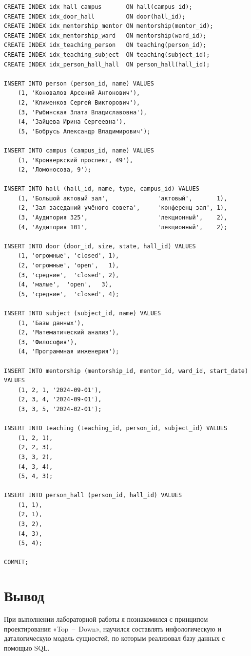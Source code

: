 \documentclass[12pt, a4paper]{article}
\begin{document}
\begin{verbatim}
CREATE INDEX idx_hall_campus       ON hall(campus_id);
CREATE INDEX idx_door_hall         ON door(hall_id);
CREATE INDEX idx_mentorship_mentor ON mentorship(mentor_id);
CREATE INDEX idx_mentorship_ward   ON mentorship(ward_id);
CREATE INDEX idx_teaching_person   ON teaching(person_id);
CREATE INDEX idx_teaching_subject  ON teaching(subject_id);
CREATE INDEX idx_person_hall_hall  ON person_hall(hall_id);

INSERT INTO person (person_id, name) VALUES
    (1, 'Коновалов Арсений Антонович'),
    (2, 'Клименков Сергей Викторович'),
    (3, 'Рыбинская Злата Владиславовна'),
    (4, 'Зайцева Ирина Сергеевна'),
    (5, 'Бобрусь Александр Владимирович');

INSERT INTO campus (campus_id, name) VALUES
    (1, 'Кронверкский проспект, 49'),
    (2, 'Ломоносова, 9');

INSERT INTO hall (hall_id, name, type, campus_id) VALUES
    (1, 'Большой актовый зал',              'актовый',       1),
    (2, 'Зал заседаний учёного совета',     'конференц-зал', 1),
    (3, 'Аудитория 325',                    'лекционный',    2),
    (4, 'Аудитория 101',                    'лекционный',    2);

INSERT INTO door (door_id, size, state, hall_id) VALUES
    (1, 'огромные', 'closed', 1),
    (2, 'огромные', 'open',   1),
    (3, 'средние',  'closed', 2),
    (4, 'малые',  'open',   3),
    (5, 'средние',  'closed', 4);

INSERT INTO subject (subject_id, name) VALUES
    (1, 'Базы данных'),
    (2, 'Математический анализ'),
    (3, 'Философия'),
    (4, 'Программная инженерия');

INSERT INTO mentorship (mentorship_id, mentor_id, ward_id, start_date) VALUES
    (1, 2, 1, '2024-09-01'),
    (2, 3, 4, '2024-09-01'),
    (3, 3, 5, '2024-02-01');

INSERT INTO teaching (teaching_id, person_id, subject_id) VALUES
    (1, 2, 1),
    (2, 2, 3),
    (3, 3, 2),
    (4, 3, 4),
    (5, 4, 3);

INSERT INTO person_hall (person_id, hall_id) VALUES
    (1, 1),
    (2, 1),
    (3, 2),
    (4, 3),
    (5, 4);

COMMIT;
\end{verbatim}

\section{Вывод}

При выполнении лабораторной работы я познакомился с принципом проектирования «Top~--~Down», научился составлять инфологическую и даталогическую модель сущностей, по которым реализовал базу данных с помощью SQL.
\end{document}
